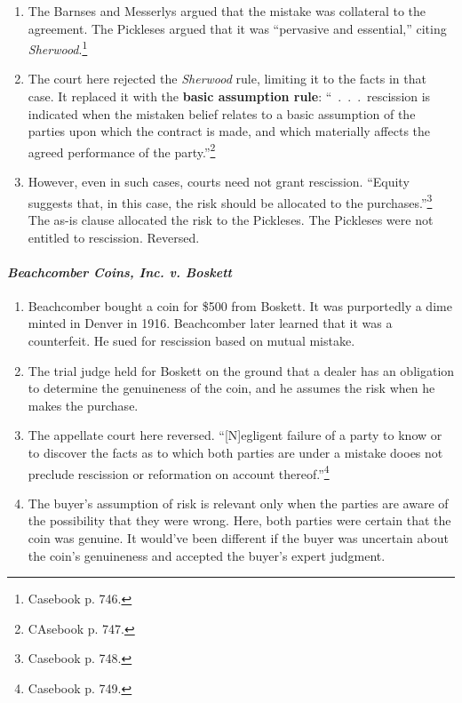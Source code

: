 \begin{enumerate}
    \item The Barnses and Messerlys argued that the mistake was collateral to 
    the agreement. The Pickleses argued that it was ``pervasive and 
    essential,'' citing \emph{Sherwood}.\footnote{Casebook p. 746.}
    \item The court here rejected the \emph{Sherwood} rule, limiting it to the 
    facts in that case. It replaced it with the \textbf{basic assumption 
    rule}: ``~.~.~.~rescission is indicated when the mistaken belief relates 
    to a basic assumption of the parties upon which the contract is made, and 
    which materially affects the agreed performance of the 
    party.''\footnote{CAsebook p. 747.}
    \item However, even in such cases, courts need not grant rescission. 
    ``Equity suggests that, in this case, the risk should be allocated to the 
    purchases.''\footnote{Casebook p. 748.} The as-is clause allocated the 
    risk to the Pickleses. The Pickleses were not entitled to rescission. 
    Reversed.
\end{enumerate}

\paragraph{\emph{Beachcomber Coins, Inc. v. Boskett}}

\begin{enumerate}
    \item Beachcomber bought a coin for \$500 from Boskett. It was purportedly 
    a dime minted in Denver in 1916. Beachcomber later learned that it was a 
    counterfeit. He sued for rescission based on mutual mistake.
    \item The trial judge held for Boskett on the ground that a dealer has an 
    obligation to determine the genuineness of the coin, and he assumes the 
    risk when he makes the purchase.
    \item The appellate court here reversed. ``[N]egligent failure of a party 
    to know or to discover the facts as to which both parties are under a 
    mistake dooes not preclude rescission or reformation on account 
    thereof.''\footnote{Casebook p. 749.}
    \item The buyer's assumption of risk is relevant only when the parties are 
    aware of the possibility that they were wrong. Here, both parties were 
    certain that the coin was genuine. It would've been different if the buyer 
    was uncertain about the coin's genuineness and accepted the buyer's expert 
    judgment.
\end{enumerate}

